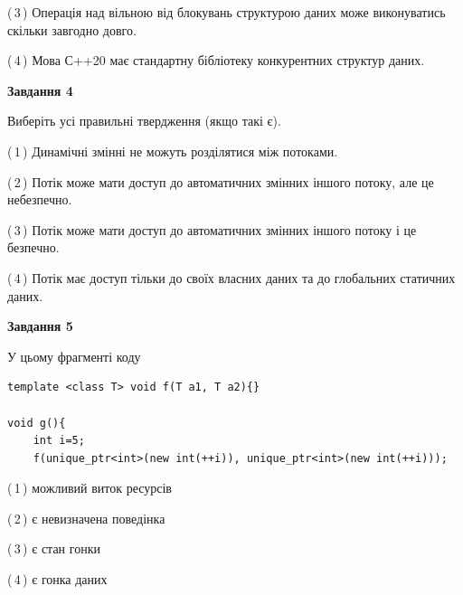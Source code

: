 \documentclass[12pt, ukrainian]{article}
\begin{document}
\begin {large}
{(\,3\,) Операція над вільною від блокувань структурою даних може виконуватись скільки завгодно довго.%

(\,4\,) Мова С++20 має стандартну бібліотеку конкурентних структур даних.%



\begin{center}
\textbf{Завдання 4}
\end{center}
Виберіть усі правильні твердження (якщо такі є).\par
\vspace{2mm}

(\,1\,) Динамічні змінні не можуть розділятися між потоками.%

(\,2\,) Потік може мати доступ до автоматичних змінних іншого потоку, але це небезпечно.%

(\,3\,) Потік може мати доступ до автоматичних змінних іншого потоку і це безпечно.%

(\,4\,) Потік має доступ тільки до своїх власних даних та до глобальних статичних даних.%



\begin{center}
\textbf{Завдання 5}
\end{center}
У цьому фрагменті коду
\begin{verbatim}
template <class T> void f(T a1, T a2){}

void g(){
    int i=5;
    f(unique_ptr<int>(new int(++i)), unique_ptr<int>(new int(++i)));
\end{verbatim}

(\,1\,) можливий виток ресурсів%

(\,2\,) є невизначена поведінка%

(\,3\,) є стан гонки%

(\,4\,) є гонка даних%


}
\end {large}
\end{document}
